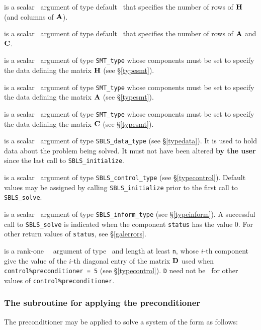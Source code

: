\documentclass{galahad}
\newcommand{\packagename}{SBLS}
\begin{document}
\begin{description}
 is a scalar \intentin\ argument of type default \integer\ that specifies
the number of rows of ${\mathbf{H}}$ (and columns of ${\mathbf{A}}$).

 is a scalar \intentin\ argument of type default \integer\ that specifies
the number of rows of ${\mathbf{A}}$ and ${\mathbf{C}}$.

 is a scalar \intentin\ argument of type {\tt SMT\_type} whose
components must be set to specify the data defining the matrix ${\mathbf{H}}$
(see \S\ref{typesmt}).

 is a scalar \intentin\ argument of type {\tt SMT\_type} whose
components must be set to specify the data defining the matrix ${\mathbf{A}}$
(see \S\ref{typesmt}).

 is a scalar \intentin\ argument of type {\tt SMT\_type} whose
components must be set to specify the data defining the matrix ${\mathbf{C}}$
(see \S\ref{typesmt}).

 is a scalar \intentinout\ argument of type
{\tt \packagename\_data\_type}
(see \S\ref{typedata}). It is used to hold data about the problem being
solved. It must not have been altered {\bf by the user} since the last call to
{\tt \packagename\_initialize}.

 is a scalar \intentin\ argument of type
{\tt \packagename\_control\_type}
(see \S\ref{typecontrol}). Default values may be assigned by calling
{\tt \packagename\_initialize} prior to the first call to
{\tt \packagename\_solve}.

 is a scalar \intentout\ argument of type
{\tt \packagename\_inform\_type}
(see \S\ref{typeinform}). A successful call to
{\tt \packagename\_solve}
is indicated when the  component {\tt status} has the value 0.
For other return values of {\tt status}, see \S\ref{galerrors}.

 is a rank-one \optional\ \intentin\ argument of type \realdp\
and length at least {\tt n}, whose $i$-th component give the value of the
$i$-th diagonal entry of the matrix ${\mathbf{D}}$ used when
{\tt control\%pre\-conditioner = 5} (see \S\ref{typecontrol}).
{\tt D} need not be \present\ for other values of {\tt control\%preconditio\-ner}.

\end{description}

\subsubsection{The subroutine for applying the preconditioner}
The preconditioner may be applied to solve a system of the
form  as follows:
\vspace*{1mm}
\end{document}
